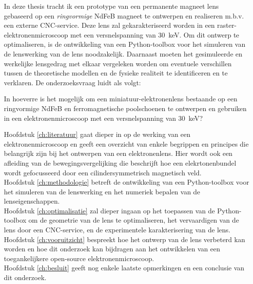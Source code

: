 \documentclass[we,twoside,openright,a4paper,11pt]{uantwerpenbamathesis}
\begin{document}
In deze thesis tracht ik een prototype van een permanente magneet lens gebaseerd op een \textit{ringvormige} NdFeB magneet te ontwerpen en realiseren m.b.v. een externe CNC-service. Deze lens zal gekarakteriseerd worden in een raster-elektronenmicroscoop met een versnelspanning van $30$~keV. Om dit ontwerp te optimaliseren, is de ontwikkeling van een Python-toolbox voor het simuleren van de lenswerking van de lens noodzakelijk. Daarnaast moeten het gesimuleerde en werkelijke lensgedrag met elkaar vergeleken worden om eventuele verschillen tussen de theoretische modellen en de fysieke realiteit te identificeren en te verklaren. De onderzoeksvraag luidt als volgt:
\vspace{5mm}
\begin{tcolorbox}[colback=gray!10!white,colframe=gray!75!black,title=Onderzoeksvraag]
    In hoeverre is het mogelijk om een miniatuur-elektronenlens bestaande op een ringvormige NdFeB en ferromagnetische poolschoenen te ontwerpen en gebruiken in een elektronenmicroscoop met een versnelspanning van $30$~keV?
\end{tcolorbox}
\vspace{5mm}

Hoofdstuk \ref{ch:literatuur} gaat dieper in op de werking van een elektronenmicroscoop en geeft een overzicht van enkele begrippen en principes die belangrijk zijn bij het ontwerpen van een elektronenlens. Hier wordt ook een afleiding  van de bewegingsvergelijking die beschrijft hoe een elekrtonenbundel wordt gefocusseerd door een cilindersymmetrisch magnetisch veld.\\

Hoofdstuk \ref{ch:methodologie} betreft de ontwikkeling van een Python-toolbox voor het simuleren van de lenswerking en het numeriek bepalen van de lenseigenschappen.\\

Hoofdstuk \ref{ch:optimalisatie} zal dieper ingaan op het toepassen van de Python-toolbox om de geometrie van de lens te optimaliseren, het vervaardigen van de lens door een CNC-service, en de experimentele karakterisering van de lens.\\

Hoofdstuk \ref{ch:vooruitzicht} bespreekt hoe het ontwerp van de lens verbeterd kan worden en hoe dit onderzoek kan bijdragen aan het ontwikkelen van een toegankelijkere open-source elektronenmicroscoop.\\

Hoofdstuk \ref{ch:besluit} geeft nog enkele laatste opmerkingen en een conclusie van dit onderzoek.\\
\end{document}
